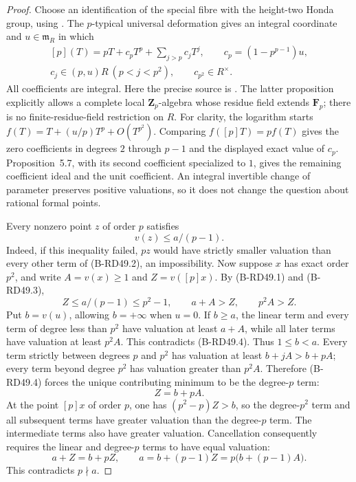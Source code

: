 \begin{proof}
Choose an identification of the special fibre with the height-two
Honda group, using \cite[Theorem~IV, pp.270--271]{Lazard1955Formal}.
The $p$-typical universal deformation gives an integral coordinate
and $u\in\mathfrak m_R$ in which
\[
 \begin{gathered}
 [p](T)=pT+c_pT^p+\sum_{j>p}c_jT^j,\qquad
 c_p=(1-p^{p-1})u,\\
 c_j\in(p,u)R\ (p<j<p^2),\qquad c_{p^2}\in R^\times.
 \end{gathered}
                                                        \tag{B-RD49.2}
\]
All coefficients are integral. Here the precise source is
\cite[Proposition~5.7 and its displayed congruence; equations
(12.3)--(12.5) and Proposition~12.10 with proof]{HopkinsGross1994Bundles}.
The latter proposition explicitly allows a complete local
$\mathbf Z_p$-algebra whose residue field extends $\mathbf F_p$;
there is no finite-residue-field restriction on $R$.
For clarity, the logarithm starts
$f(T)=T+(u/p)T^p+O(T^{p^2})$. Comparing
$f([p]T)=pf(T)$ gives the zero coefficients in degrees $2$ through
$p-1$ and the displayed exact value of $c_p$.
Proposition~5.7, with its second coefficient specialized to $1$,
gives the remaining coefficient ideal and the unit coefficient.
An integral invertible change of parameter preserves positive
valuations, so it does not change the question about rational
formal points.

Every nonzero point $z$ of order $p$ satisfies
\[
                           v(z)\leq a/(p-1).            \tag{B-RD49.3}
\]
Indeed, if this inequality failed, $pz$ would have strictly smaller
valuation than every other term of (B-RD49.2), an impossibility.
Now suppose $x$ has exact order $p^2$, and write
$A=v(x)\geq1$ and $Z=v([p]x)$. By (B-RD49.1) and (B-RD49.3),
\[
              Z\leq a/(p-1)\leq p^2-1,
              \qquad a+A>Z,\qquad p^2A>Z.             \tag{B-RD49.4}
\]
Put $b=v(u)$, allowing $b=+\infty$ when $u=0$.
If $b\geq a$, the linear term and every term of degree less than
$p^2$ have valuation at least $a+A$, while all later terms have
valuation at least $p^2A$. This contradicts (B-RD49.4).
Thus $1\leq b<a$. Every term strictly between degrees $p$ and
$p^2$ has valuation at least $b+jA>b+pA$; every term beyond degree
$p^2$ has valuation greater than $p^2A$. Therefore (B-RD49.4)
forces the unique contributing minimum to be the degree-$p$ term:
\[
                              Z=b+pA.                  \tag{B-RD49.5}
\]
At the point $[p]x$ of order $p$, one has
$(p^2-p)Z>b$, so the degree-$p^2$ term and all subsequent terms
have greater valuation than the degree-$p$ term. The intermediate
terms also have greater valuation. Cancellation consequently
requires the linear and degree-$p$ terms to have equal valuation:
\[
            a+Z=b+pZ,\qquad
            a=b+(p-1)Z=p\bigl(b+(p-1)A\bigr).
                                                        \tag{B-RD49.6}
\]
This contradicts $p\nmid a$.
\end{proof}

